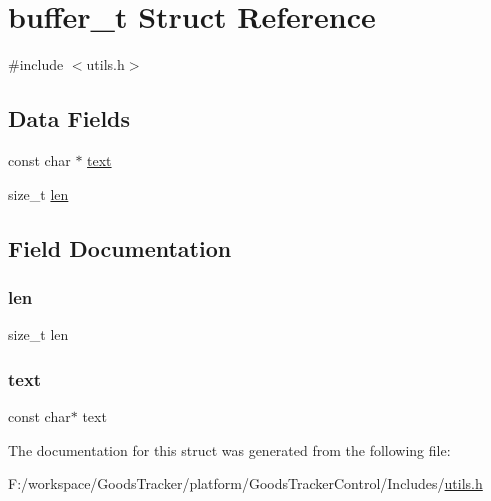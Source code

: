 \hypertarget{structbuffer__t}{}\section{buffer\+\_\+t Struct Reference}
\label{structbuffer__t}


{\ttfamily \#include $<$utils.\+h$>$}

\subsection*{Data Fields}
\begin{DoxyCompactItemize}
\item 
const char $\ast$ \hyperlink{structbuffer__t_a16343090e80c4472521560f30113d96c}{text}
\item 
size\+\_\+t \hyperlink{structbuffer__t_a7360b55975153b822efc5217b7734e6a}{len}
\end{DoxyCompactItemize}


\subsection{Field Documentation}
\mbox{\label{structbuffer__t_a7360b55975153b822efc5217b7734e6a}} 
\subsubsection{\texorpdfstring{len}{len}}
{\footnotesize\ttfamily size\+\_\+t len}

\mbox{\label{structbuffer__t_a16343090e80c4472521560f30113d96c}} 
\subsubsection{\texorpdfstring{text}{text}}
{\footnotesize\ttfamily const char$\ast$ text}



The documentation for this struct was generated from the following file\+:\begin{DoxyCompactItemize}
\item 
F\+:/workspace/\+Goods\+Tracker/platform/\+Goods\+Tracker\+Control/\+Includes/\hyperlink{utils_8h}{utils.\+h}\end{DoxyCompactItemize}
